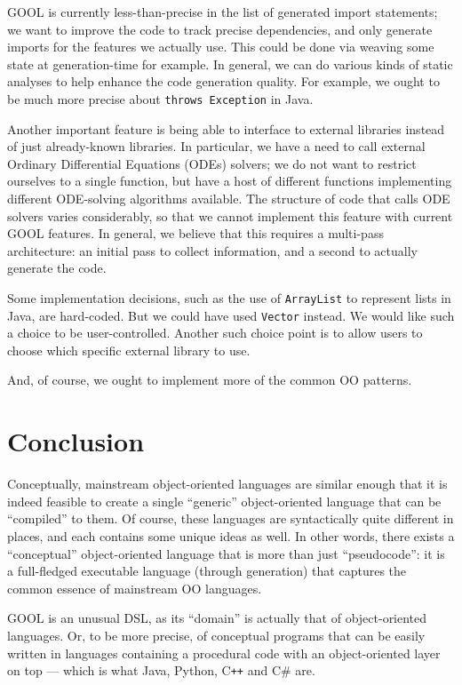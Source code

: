 \documentclass[sigplan,review,anonymous,prologue,dvipsnames]{acmart}
\newcommand{\Csharp}{C\#}
\newcommand{\Cplusplus}{C\texttt{++}}
\begin{document}
GOOL is currently less-than-precise in the list of generated import statements;
we want to improve the code to track precise dependencies, and only generate
imports for the features we actually use. This could be done via weaving
some state at generation-time for example.  In general, we can do various 
kinds of static analyses to help enhance the code generation quality.
For example, we ought to be much more precise about \verb|throws Exception|
in Java.

Another important feature is being able to interface to external libraries
instead of just already-known libraries. In particular, we have a need to
call external Ordinary Differential Equations (ODEs) solvers; we do not
want to restrict ourselves to a single function, but have a host of
different functions implementing different ODE-solving algorithms available.
The structure of code that calls ODE solvers varies considerably, so that we cannot
implement this feature with current GOOL features.  In general, we believe
that this requires a multi-pass architecture: an initial pass to collect
information, and a second to actually generate the code.

Some implementation decisions, such as the use of \verb|ArrayList| to represent
lists in Java, are hard-coded. But we could have used \verb|Vector| instead.
We would like such a choice to be user-controlled. Another such choice
point is to allow users to choose which specific external library to use.

And, of course, we ought to implement more of the common OO patterns.

\section{Conclusion} \label{sec:conclusions}

Conceptually, mainstream object-oriented languages are similar enough that it
is indeed feasible to create a single ``generic'' object-oriented language that
can be ``compiled'' to them.  Of course, these languages are syntactically
quite different in places, and each contains some unique ideas as well.
In other words, there exists a ``conceptual'' object-oriented language that
is more than just ``pseudocode'': it is a full-fledged executable language
(through generation) that captures the common essence of mainstream OO
languages.

GOOL is an unusual DSL, as its ``domain'' is actually that of object-oriented
languages. Or, to be more precise, of conceptual programs that can be
easily written in languages containing a procedural code with an
object-oriented layer on top --- which is what Java, Python, \Cplusplus{} and
\Csharp{} are.
\end{document}
